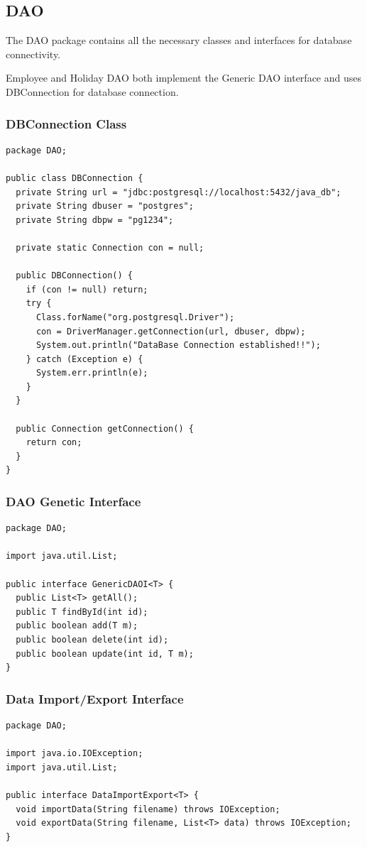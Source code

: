 \documentclass[12pt]{article}
\begin{document}
\subsection{DAO}

The DAO package contains all the necessary classes and interfaces
for database connectivity.

Employee and Holiday DAO both implement the Generic DAO interface
and uses DBConnection for database connection.

\subsubsection{DBConnection Class}
\begin{lstlisting}
package DAO;

public class DBConnection {
  private String url = "jdbc:postgresql://localhost:5432/java_db";
  private String dbuser = "postgres";
  private String dbpw = "pg1234";

  private static Connection con = null;

  public DBConnection() {
    if (con != null) return;
    try {
      Class.forName("org.postgresql.Driver");
      con = DriverManager.getConnection(url, dbuser, dbpw);
      System.out.println("DataBase Connection established!!");
    } catch (Exception e) {
      System.err.println(e);
    }
  }

  public Connection getConnection() {
    return con;
  }
}
\end{lstlisting}

\subsubsection{DAO Genetic Interface}
\begin{lstlisting}
package DAO;

import java.util.List;

public interface GenericDAOI<T> {
  public List<T> getAll();
  public T findById(int id);
  public boolean add(T m);
  public boolean delete(int id);
  public boolean update(int id, T m);
}
\end{lstlisting}

\pagebreak

\subsubsection{Data Import/Export Interface}
\begin{lstlisting}
package DAO;

import java.io.IOException;
import java.util.List;

public interface DataImportExport<T> {
  void importData(String filename) throws IOException;
  void exportData(String filename, List<T> data) throws IOException;
}
\end{lstlisting}
\end{document}
